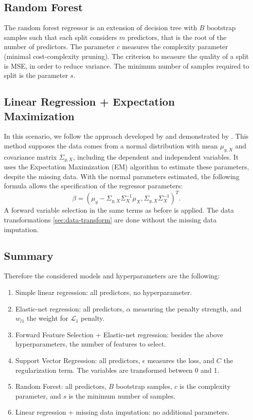 \subsection{Random Forest}

The random forest regressor is an extension of decision tree with $B$
bootstrap samples such that each split considers $m$ predictors, that is the
root of the number of predictors. The parameter
$c$ measures the complexity parameter (minimal cost-complexity pruning).
The criterion to measure the quality of a split is MSE, in order to reduce
variance. The minimum number of samples required to split is the parameter
$s$. 


\subsection{Linear Regression + Expectation Maximization}

In this scenario, we follow the approach developed by \cite{rubin1977} and
demonstrated by \cite{missing-values-estimation}. This method supposes the
data comes from a normal distribution with mean $\mu_{y,X}$ and covariance matrix
$\Sigma_{y,X}$, including the dependent and independent variables. It uses the Expectation Maximization (EM) algorithm to estimate
these parameters, despite the missing data. With the normal parameters estimated, the following formula
allows the specification of the regressor parameters:
$$
\beta = (\mu_y - \Sigma_{y,X}\Sigma_X^{-1}\mu_X, \Sigma_{y,X}\Sigma_X^{-1})^T.
$$
A forward variable selection in the same terms as before is applied. The data
transformations \ref{sec:data-transform} are done without the missing data imputation.  

\subsection{Summary} 

Therefore the considered models and hyperparameters are the following:

\begin{enumerate}
    \item Simple linear regression: all predictors, no hyperparameter. 
    \item Elastic-net regression: all predictors, $\alpha$ measuring the
    penalty strength, and $w_{l1}$ the weight for $\mathcal{L}_1$ penalty. 
    \item Forward Feature Selection + Elastic-net regression: besides the
    above hyperparameters, the number of features to select. 
    \item Support Vector Regression: all predictors, $\epsilon$ measures the
    loss, and $C$ the regularization term. The variables are transformed
    between 0 and 1. 
    \item Random Forest: all predictors, $B$ bootstrap samples, $c$ is the
    complexity parameter, and $s$ is the minimum number of samples. 
    \item Linear regression + missing data imputation: no additional
    parameters. 
\end{enumerate}